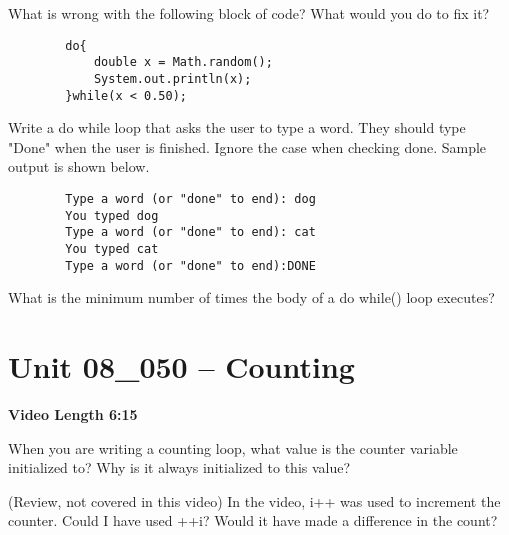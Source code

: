 \documentclass[letterpaper,12pt]{exam}
\newcommand{\unit}{Unit 08}
\begin{document}
\begin{questions}
\begin{samepage}
    \question What is wrong with the following block of code?  What would you do to fix it?
    \begin{verbatim}
        do{
            double x = Math.random();
            System.out.println(x);
        }while(x < 0.50);
    \end{verbatim}
    \vspace{5mm}
\end{samepage}
\begin{samepage}
    \question Write a do while loop that asks the user to type a word.  They should type "Done" when the user is finished.  Ignore the case when checking done.  Sample output is shown below.
    \begin{verbatim}
        Type a word (or "done" to end): dog 
        You typed dog
        Type a word (or "done" to end): cat 
        You typed cat
        Type a word (or "done" to end):DONE 
    \end{verbatim}     
       \vspace{15mm}
\end{samepage}

\begin{samepage}
    \question What is the minimum number of times the body of a do{} while() loop executes?
    \vspace{5mm}
\end{samepage}



\section*{\unit\_050 -- Counting} %
\par{\selectfont\textbf{Video Length 6:15}}

\begin{samepage}
    \question When you are writing a counting loop, what value is the counter variable initialized to?  Why is it always initialized to this value?
    \vspace{5mm}
\end{samepage}
\begin{samepage}
    \question (Review, not covered in this video)  In the video, i++ was used to increment the counter.  Could I have used ++i?  Would it have made a difference in the count?
    \vspace{5mm}
\end{samepage}


\end{questions}
\end{document}
